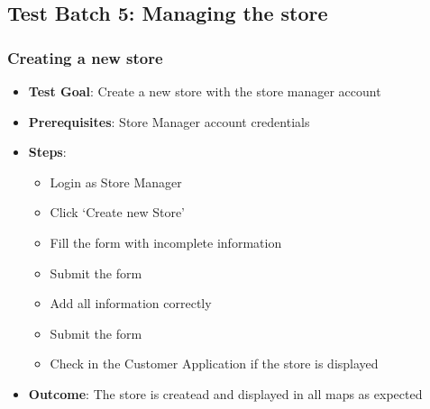 \clearpage

\subsection{Test Batch 5: Managing the store}
\subsubsection{Creating a new store}
\begin{itemize}
    \item \textbf{Test Goal}: Create a new store with the store manager account
    \item \textbf{Prerequisites}: Store Manager account credentials
    \item \textbf{Steps}:
          \begin{itemize}
              \item Login as Store Manager
              \item Click `Create new Store'
              \item Fill the form with incomplete information
              \item Submit the form
              \item Add all information correctly
              \item Submit the form
              \item Check in the Customer Application if the store is displayed
          \end{itemize}
    \item \textbf{Outcome}: The store is createad and displayed in all maps as expected
\end{itemize}
